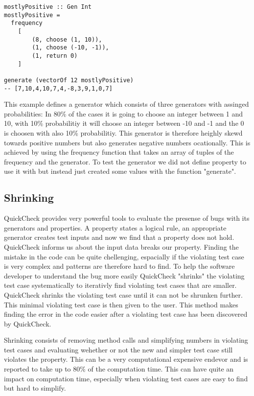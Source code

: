 \documentclass[a4paper, 12pt]{article} %
\begin{document}
\begin{verbatim}
mostlyPositive :: Gen Int
mostlyPositive =
  frequency
    [ 
        (8, choose (1, 10)),
        (1, choose (-10, -1)),
        (1, return 0)
    ]

generate (vectorOf 12 mostlyPositive) 
-- [7,10,4,10,7,4,-8,3,9,1,0,7]
\end{verbatim}

This example defines a generator which consists of three generators with assinged probabilities: In 80\% of the cases it is going to choose an integer between 1 and 10, with 10\% probabilitiy it will choose an integer between -10 and -1 and the 0 is choosen with also 10\% probabilitiy. This generator is therefore heighly skewd towards positive numbers but also generates negative numbers ocationally. This is achieved by using the frequency function that takes an array of tuples of the frequency and the generator. To test the generator we did not define property to use it with but instead just created some values with the function "generate".

\subsection{Shrinking}

QuickCheck provides very powerful tools to evaluate the presense of bugs with its generators and properties. A property states a logical rule, an appropriate generator creates test inputs and now we find that a property does not hold. QuickCheck informs us about the input data breaks our property. Finding the mistake in the code can be quite chellenging, espacially if the violating test case is very complex and patterns are therefore hard to find. To help the software developer to understand the bug more easily QuickCheck "shrinks" the violating test case systematically to iterativly find violating test cases that are smaller. QuickCheck shrinks the violating test case until it can not be shrunken further. This minimal violating test case is then given to the user. This method makes finding the error in the code easier after a violating test case has been discovered by QuickCheck. \cite{Claessen2009}

Shrinking consists of removing method calls and simplifying numbers in violating test cases and evaluating wehether or not the new and simpler test case still violates the property. This can be a very computational expensive endevor and is reported to take up to 80\% of the computation time. This can have quite an impact on computation time, especially when violating test cases are easy to find but hard to simplify. \cite{Hughes:2016}
\end{document}
